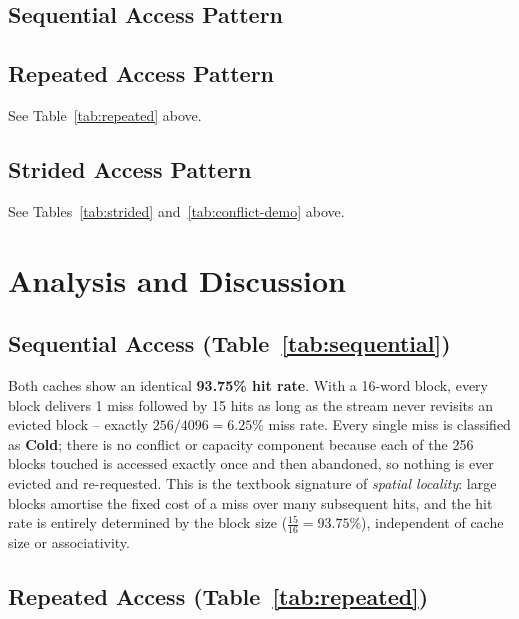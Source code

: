 \documentclass[11pt]{article}
\begin{document}
\subsection{Sequential Access Pattern}



\subsection*{Repeated Access Pattern}
See Table~\ref{tab:repeated} above.

\subsection*{Strided Access Pattern}
See Tables~\ref{tab:strided} and~\ref{tab:conflict-demo} above.

\section{Analysis and Discussion}

\subsection{Sequential Access (Table~\ref{tab:sequential})}

Both caches show an identical \textbf{93.75\% hit rate}. With a 16-word
block, every block delivers 1 miss followed by 15 hits as long as the
stream never revisits an evicted block -- exactly $256/4096 = 6.25\%$
miss rate. Every single miss is classified as \textbf{Cold}; there is
no conflict or capacity component because each of the 256 blocks
touched is accessed exactly once and then abandoned, so nothing is ever
evicted and re-requested. This is the textbook signature of
\emph{spatial locality}: large blocks amortise the fixed cost of a
miss over many subsequent hits, and the hit rate is entirely
determined by the block size ($\frac{15}{16}=93.75\%$), independent of
cache size or associativity.

\subsection{Repeated Access (Table~\ref{tab:repeated})}
\end{document}
